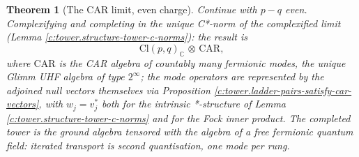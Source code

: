 \documentclass[11pt]{article}
\newtheorem{theorem}{Theorem}[section]
\theoremstyle{definition}
\theoremstyle{plain}
\providecommand{\C}{}\renewcommand{\C}{\mathbb{C}}
\providecommand{\CAR}{}\renewcommand{\CAR}{\mathrm{CAR}}
\providecommand{\Cl}{}\renewcommand{\Cl}{\mathrm{Cl}}
\begin{document}
\begin{theorem}[The CAR limit, even charge]\label{c:tower.car-limit-even-charge}
Continue with $p - q$ even. Complexifying and completing in the unique C*-norm of the complexified limit (Lemma \ref{c:tower.structure-tower-c-norms}): the result is
\[
\Cl(p,q)_\C \,\otimes\, \CAR,
\]
where $\CAR$ is the CAR algebra of countably many fermionic modes, the unique Glimm UHF algebra of type $2^\infty$; the mode operators are represented by the adjoined null vectors themselves via Proposition \ref{c:tower.ladder-pairs-satisfy-car-vectors}, with $w_j = v_j^*$ both for the intrinsic *-structure of Lemma \ref{c:tower.structure-tower-c-norms} and for the Fock inner product. The completed tower is the ground algebra tensored with the algebra of a free fermionic quantum field: iterated transport is second quantisation, one mode per rung.
\end{theorem}
\end{document}
